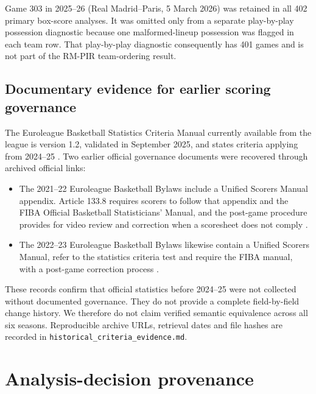 \documentclass[pdflatex,sn-mathphys-num]{sn-jnl}
\begin{document}
Game 303 in 2025--26 (Real Madrid--Paris, 5 March 2026) was retained in all 402 primary box-score analyses. It was omitted only from a separate play-by-play possession diagnostic because one malformed-lineup possession was flagged in each team row. That play-by-play diagnostic consequently has 401 games and is not part of the RM-PIR team-ordering result.

\subsection{Documentary evidence for earlier scoring governance}

The Euroleague Basketball Statistics Criteria Manual currently available from the league is version 1.2, validated in September 2025, and states criteria applying from 2024--25 \cite{EuroleagueStatsManual2025}. Two earlier official governance documents were recovered through archived official links:

\begin{itemize}
\item The 2021--22 Euroleague Basketball Bylaws include a Unified Scorers Manual appendix. Article 133.8 requires scorers to follow that appendix and the FIBA Official Basketball Statisticians' Manual, and the post-game procedure provides for video review and correction when a scoresheet does not comply \cite{EuroleagueBylaws2021}.
\item The 2022--23 Euroleague Basketball Bylaws likewise contain a Unified Scorers Manual, refer to the statistics criteria test and require the FIBA manual, with a post-game correction process \cite{EuroleagueBylaws2022}.
\end{itemize}

These records confirm that official statistics before 2024--25 were not collected without documented governance. They do not provide a complete field-by-field change history. We therefore do not claim verified semantic equivalence across all six seasons. Reproducible archive URLs, retrieval dates and file hashes are recorded in \texttt{historical\_criteria\_evidence.md}.

\section{Analysis-decision provenance}
\end{document}
